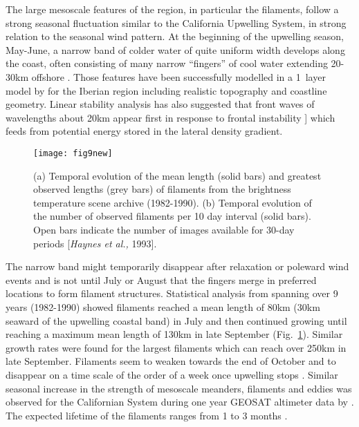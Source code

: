 The large mesoscale features of the region, in particular the
filaments, follow a strong seasonal fluctuation similar to the
California Upwelling System, in strong relation to the seasonal
wind pattern. At the beginning of the upwelling season, May-June,
a narrow band of colder water of quite uniform width develops
along the coast, often consisting of many narrow ``fingers'' of
cool water extending 20-30km offshore \citep{Haynes93}. Those
features have been successfully modelled in a 1\onehalf \, layer
model by \citet{Roed96} for the Iberian region including realistic
topography and coastline geometry. Linear stability analysis has
also suggested that front waves of wavelengths about 20km appear
first \citep{Barth94} in response to frontal instability
\citep[e.g.][]{Washburn88,McCreary91}] which feeds from potential
energy stored in the lateral density gradient.

\begin{figure}
  \centering
  \texttt{[image: fig9new]}
  \caption{(a) Temporal evolution of the mean length (solid bars)
  and greatest observed lengths (grey bars) of filaments from the
  brightness temperature scene archive (1982-1990). (b) Temporal
  evolution of the number of observed filaments per 10 day
  interval (solid bars). Open bars indicate the number of images
  available for 30-day periods [{\it Haynes et al., }1993].}
  \label{fig:filstats}
\end{figure}
The narrow band might temporarily disappear after relaxation or
poleward wind events and is not until July or August that the
fingers merge in preferred locations to form filament structures.
Statistical analysis from \citet{Haynes93} spanning over 9 years
(1982-1990) showed filaments reached a mean length of 80km (30km
seaward of the upwelling coastal band) in July and then continued
growing until reaching a maximum mean length of 130km in late
September (Fig.~\ref{fig:filstats}). Similar growth rates were
found for the largest filaments which can reach over 250km in late
September. Filaments seem to weaken towards the end of October and
to disappear on a time scale of the order of a week once upwelling
stops \citep{Haynes93}. Similar seasonal increase in the strength
of mesoscale meanders, filaments  and eddies was observed for the
Californian System during one year GEOSAT altimeter data by
\citet{Flament89}. The expected lifetime of the filaments ranges
from 1 to 3 months \citep{Haynes93,Sousa95}.


